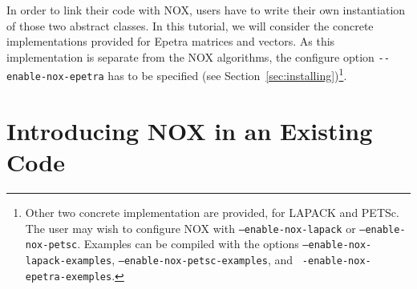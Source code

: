 In order to link their code with NOX, users have to write their own
instantiation of those two abstract classes. In this tutorial, we will
consider the concrete implementations provided for Epetra matrices and
vectors. As this implementation is separate from the NOX algorithms, the
configure option \verb!--enable-nox-epetra! has to be specified (see
Section~\ref{sec:installing})\footnote{Other two concrete implementation
  are provided, for LAPACK and PETSc. The user may wish to configure NOX
  with {\tt --enable-nox-lapack} or {\tt --enable-nox-petsc}. Examples
  can be compiled with the options {\tt --enable-nox-lapack-examples},
  {\tt --enable-nox-petsc-examples}, and {\tt
    -enable-nox-epetra-exemples}.}.


\section{Introducing NOX in an Existing Code}
\label{sec:nox_introduce}

